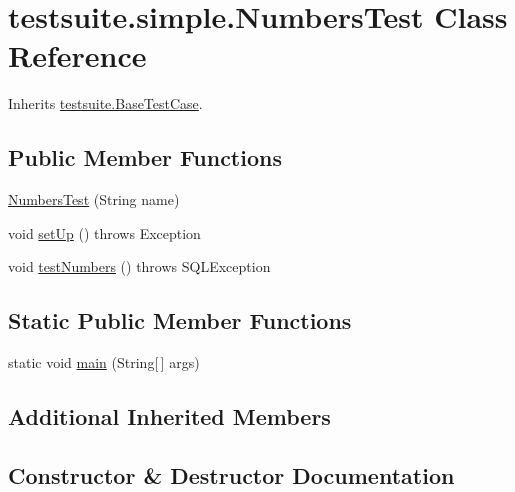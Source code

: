 \hypertarget{classtestsuite_1_1simple_1_1_numbers_test}{}\section{testsuite.\+simple.\+Numbers\+Test Class Reference}
\label{classtestsuite_1_1simple_1_1_numbers_test}


Inherits \mbox{\hyperlink{classtestsuite_1_1_base_test_case}{testsuite.\+Base\+Test\+Case}}.

\subsection*{Public Member Functions}
\begin{DoxyCompactItemize}
\item 
\mbox{\hyperlink{classtestsuite_1_1simple_1_1_numbers_test_adad110f92c704d82cdbaa52ed9626573}{Numbers\+Test}} (String name)
\item 
void \mbox{\hyperlink{classtestsuite_1_1simple_1_1_numbers_test_a6cdec77fd619aab7060428194f75d50b}{set\+Up}} ()  throws Exception 
\item 
void \mbox{\hyperlink{classtestsuite_1_1simple_1_1_numbers_test_aecceecbd6a68dcd409c3553f1a0e210e}{test\+Numbers}} ()  throws S\+Q\+L\+Exception 
\end{DoxyCompactItemize}
\subsection*{Static Public Member Functions}
\begin{DoxyCompactItemize}
\item 
static void \mbox{\hyperlink{classtestsuite_1_1simple_1_1_numbers_test_a71ce4bec6ea91a72a2818b53e626d99b}{main}} (String\mbox{[}$\,$\mbox{]} args)
\end{DoxyCompactItemize}
\subsection*{Additional Inherited Members}


\subsection{Constructor \& Destructor Documentation}
\mbox{\label{classtestsuite_1_1simple_1_1_numbers_test_adad110f92c704d82cdbaa52ed9626573}} 
